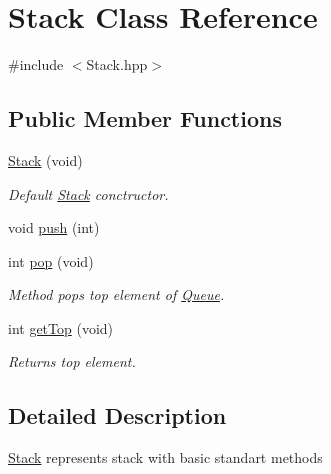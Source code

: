 \hypertarget{class_stack}{\section{Stack Class Reference}
\label{class_stack}
}


{\ttfamily \#include $<$Stack.\-hpp$>$}

\subsection*{Public Member Functions}
\begin{DoxyCompactItemize}
\item 
\hypertarget{class_stack_aa6e4e33ccce6c9a8df6e5519418bbd45}{\hyperlink{class_stack_aa6e4e33ccce6c9a8df6e5519418bbd45}{Stack} (void)}\label{class_stack_aa6e4e33ccce6c9a8df6e5519418bbd45}

\begin{DoxyCompactList}\small\item\em Default \hyperlink{class_stack}{Stack} conctructor. \end{DoxyCompactList}\item 
void \hyperlink{class_stack_acaf50a3a40fc274ee1392cce00b02979}{push} (int)
\item 
\hypertarget{class_stack_ada9303d9b866e2289e1eb1a2f297a934}{int \hyperlink{class_stack_ada9303d9b866e2289e1eb1a2f297a934}{pop} (void)}\label{class_stack_ada9303d9b866e2289e1eb1a2f297a934}

\begin{DoxyCompactList}\small\item\em Method pops top element of \hyperlink{class_queue}{Queue}. \end{DoxyCompactList}\item 
\hypertarget{class_stack_aa1d8248267f5ed583a66551ef7e88789}{int \hyperlink{class_stack_aa1d8248267f5ed583a66551ef7e88789}{get\-Top} (void)}\label{class_stack_aa1d8248267f5ed583a66551ef7e88789}

\begin{DoxyCompactList}\small\item\em Returns top element. \end{DoxyCompactList}\end{DoxyCompactItemize}


\subsection{Detailed Description}
\hyperlink{class_stack}{Stack} represents stack with basic standart methods 

